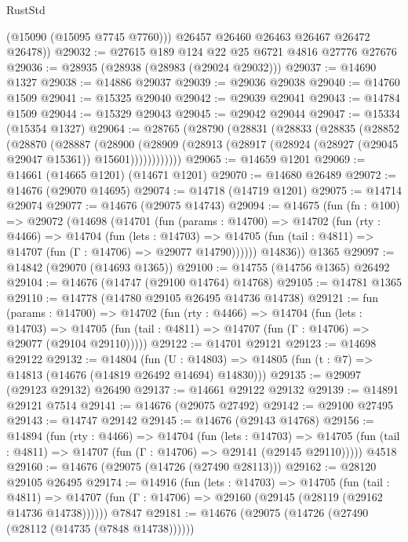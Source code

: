 \begin{lexlean}{RustStd}
\begin{coremodule}
          (@15090 (@15095 @7745 @7760)))
        @26457
        @26460
        @26463
        @26467
        @26472
        @26478))
@29032 := @27615 @189 @124 @22 @25 @6721 @4816 @27776 @27676
@29036 := @28935 (@28938 (@28983 (@29024 @29032)))
@29037 := @14690 @1327
@29038 := @14886 @29037
@29039 := @29036 @29038
@29040 := @14760 @1509
@29041 := @15325 @29040
@29042 := @29039 @29041
@29043 := @14784 @1509
@29044 := @15329 @29043
@29045 := @29042 @29044
@29047 := @15334 (@15354 @1327)
@29064 := @28765
    (@28790
      (@28831
        (@28833
          (@28835
            (@28852
              (@28870
                (@28887
                  (@28900
                    (@28909
                      (@28913 (@28917 (@28924 (@28927 (@29045 @29047 @15361)) @15601))))))))))))
@29065 := @14659 @1201
@29069 := @14661 (@14665 @1201) (@14671 @1201)
@29070 := @14680 @26489
@29072 := @14676 (@29070 @14695)
@29074 := @14718 (@14719 @1201)
@29075 := @14714 @29074
@29077 := @14676 (@29075 @14743)
@29094 := @14675
    (fun (fn : @100) =>
    @29072
      (@14698
        (@14701
          (fun (params : @14700) =>
          @14702
            (fun (rty : @4466) =>
            @14704
              (fun (lets : @14703) =>
              @14705 (fun (tail : @4811) => @14707 (fun (Γ : @14706) => @29077 @14790))))))
        @14836))
    @1365
@29097 := @14842 (@29070 (@14693 @1365))
@29100 := @14755 (@14756 @1365) @26492
@29104 := @14676 (@14747 (@29100 @14764) @14768)
@29105 := @14781 @1365
@29110 := @14778 (@14780 @29105 @26495 @14736 @14738)
@29121 := fun (params : @14700) =>
  @14702
    (fun (rty : @4466) =>
    @14704
      (fun (lets : @14703) =>
      @14705 (fun (tail : @4811) => @14707 (fun (Γ : @14706) => @29077 (@29104 @29110)))))
@29122 := @14701 @29121
@29123 := @14698 @29122
@29132 := @14804
    (fun (U : @14803) => @14805 (fun (t : @7) => @14813 (@14676 (@14819 @26492 @14694) @14830)))
@29135 := @29097 (@29123 @29132) @26490
@29137 := @14661 @29122 @29132
@29139 := @14891 @29121 @7514
@29141 := @14676 (@29075 @27492)
@29142 := @29100 @27495
@29143 := @14747 @29142
@29145 := @14676 (@29143 @14768)
@29156 := @14894
    (fun (rty : @4466) =>
    @14704
      (fun (lets : @14703) =>
      @14705 (fun (tail : @4811) => @14707 (fun (Γ : @14706) => @29141 (@29145 @29110)))))
    @4518
@29160 := @14676 (@29075 (@14726 (@27490 @28113)))
@29162 := @28120 @29105 @26495
@29174 := @14916
    (fun (lets : @14703) =>
    @14705
      (fun (tail : @4811) =>
      @14707 (fun (Γ : @14706) => @29160 (@29145 (@28119 (@29162 @14736 @14738))))))
    @7847
@29181 := @14676 (@29075 (@14726 (@27490 (@28112 (@14735 (@7848 @14738))))))

\end{coremodule}
\end{lexlean}
